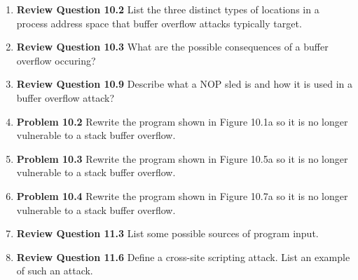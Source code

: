 \documentclass[12pt]{article}
\begin{document}
\renewcommand{\headrulewidth}{0.4pt}
\vspace{-3mm}
\begin{enumerate}
\item \textbf{Review Question 10.2} List the three distinct types of locations in a process address space that buffer overflow attacks typically target. \\
\item \textbf{Review Question 10.3} What are the possible consequences of a buffer overflow occuring? \\
\item \textbf{Review Question 10.9} Describe what a NOP sled is and how it is used in a buffer overflow attack? \\
\item \textbf{Problem 10.2} Rewrite the program shown in Figure 10.1a so it is no longer vulnerable to a stack buffer overflow. \\
\item \textbf{Problem 10.3} Rewrite the program shown in Figure 10.5a so it is no longer vulnerable to a stack buffer overflow. \\
\item \textbf{Problem 10.4}  Rewrite the program shown in Figure 10.7a so it is no longer vulnerable to a stack buffer overflow. \\
\item \textbf{Review Question 11.3} List some possible sources of program input. \\
\item \textbf{Review Question 11.6} Define a cross-site scripting attack. List an example of such an attack. \\
\end{enumerate}
\end{document}
